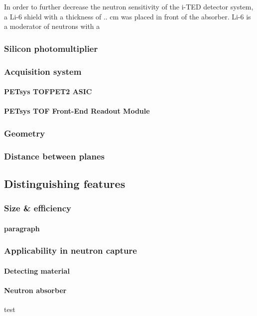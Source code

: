 In order to further decrease the neutron sensitivity of the \ac{i-TED} detector system, a Li-6 shield with a thickness of .. cm was placed in front of the absorber. Li-6 is a moderator of neutrons with a 

\subsubsection{Silicon photomultiplier}

\subsubsection{Acquisition system}

\paragraph*{PETsys TOFPET2 ASIC}

\paragraph*{PETsys TOF Front-End Readout Module}

\subsubsection{Geometry}

\subsubsection{Distance between planes}


\subsection{Distinguishing features}

\subsubsection{Size \& efficiency}

\paragraph{paragraph}

\subsubsection{Applicability in neutron capture}

\paragraph{Detecting material}

\paragraph{Neutron absorber}

test